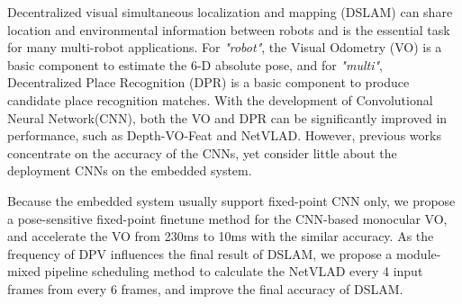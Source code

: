 Decentralized visual simultaneous localization and
mapping (DSLAM) can share location and environmental information between robots and is the essential task for many multi-robot applications. For \textit{"robot"}, the Visual Odometry (VO) is a basic component to estimate the 6-D absolute pose, and for \textit{"multi"}, Decentralized Place Recognition (DPR) is a basic component to produce candidate place recognition matches.
With the development of Convolutional Neural Network(CNN), both the VO and DPR can be significantly improved in performance, such as Depth-VO-Feat\cite{Zhan:2018e92} and NetVLAD\cite{Arandjelovic:2017997}. However, previous works concentrate on the accuracy of the CNNs, yet consider little about the deployment CNNs on the embedded system.

Because the embedded system usually support fixed-point CNN only, we propose a pose-sensitive fixed-point finetune method for the CNN-based monocular VO, and accelerate the VO from 230ms to 10ms with the similar accuracy. As the frequency of DPV influences the final result of DSLAM, we propose a module-mixed pipeline scheduling method to calculate the NetVLAD every 4 input frames from every 6 frames, and improve the final accuracy of DSLAM.


